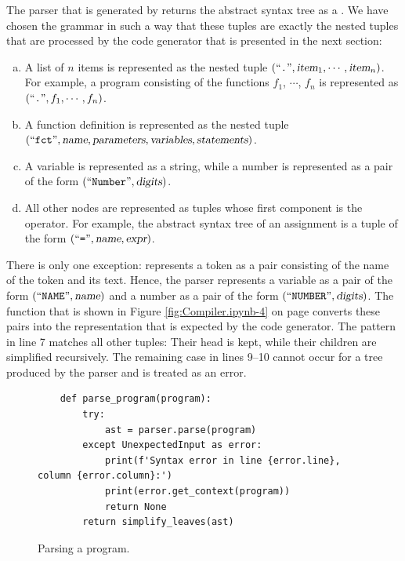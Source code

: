 The parser that is generated by  returns the abstract syntax tree as a .  We have chosen the grammar in such a way that these tuples are exactly the nested
tuples that are processed by the code generator that is presented in the next section:
\begin{enumerate}[(a)]
\item A list of $n$ items is represented as the nested tuple $(\mbox{``\texttt{.}''}, \textsl{item}_1, \cdots,
      \textsl{item}_n)$.  For example, a program consisting of the functions $f_1$, $\cdots$, $f_n$ is
      represented as $(\mbox{``\texttt{.}''}, f_1, \cdots, f_n)$.
\item A function definition is represented as the nested tuple
      \\[0.2cm]
      \hspace*{1.3cm}
      $(\mbox{``\texttt{fct}''}, \textsl{name}, \textsl{parameters}, \textsl{variables}, \textsl{statements})$.
\item A variable is represented as a string, while a number is represented as a pair of the form
      $(\mbox{``\texttt{Number}''}, \textsl{digits})$.
\item All other nodes are represented as tuples whose first component is the operator.
      For example, the abstract syntax tree of an assignment is a tuple of the form
      $(\mbox{``\texttt{=}''}, \textsl{name}, \textsl{expr})$.
\end{enumerate}
There is only one exception:   represents a token as a pair consisting of the name of the token
and its text.  Hence, the parser represents a variable as a pair of the form $(\mbox{``\texttt{NAME}''},
\textsl{name})$ and a number as a pair of the form $(\mbox{``\texttt{NUMBER}''}, \textsl{digits})$.  The function
 that is shown in Figure \ref{fig:Compiler.ipynb-4} on page
\pageref{fig:Compiler.ipynb-4} converts these pairs into the representation that is expected by the code
generator.  The pattern  in line 7 matches all other tuples:  Their head is kept,
while their children are simplified recursively.  The remaining case in lines 9--10 cannot occur for a tree
produced by the parser and is treated as an error.

\begin{figure}[!ht]
\centering
\begin{verbatim}
    def parse_program(program):
        try:
            ast = parser.parse(program)
        except UnexpectedInput as error:
            print(f'Syntax error in line {error.line}, column {error.column}:')
            print(error.get_context(program))
            return None
        return simplify_leaves(ast)
\end{verbatim}
\vspace*{-0.3cm}
\caption{Parsing a program.}
\label{fig:Compiler.ipynb-6}
\end{figure}

